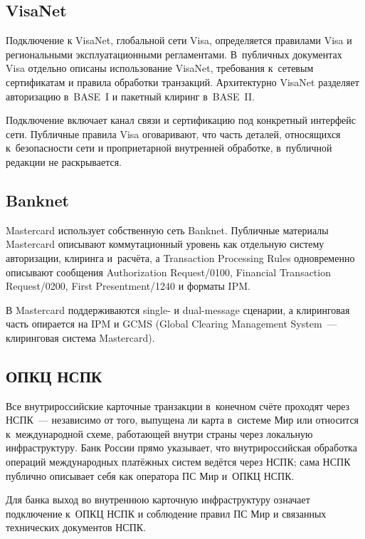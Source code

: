 \subsection*{VisaNet}

Подключение к VisaNet, глобальной сети Visa, определяется
правилами Visa и региональными эксплуатационными регламентами.
В~публичных документах Visa отдельно описаны использование
VisaNet, требования к~сетевым сертификатам и правила обработки
транзакций. Архитектурно VisaNet разделяет авторизацию в~BASE~I
и пакетный клиринг в~BASE~II.~\cite{visa-core-rules}

Подключение включает канал связи и сертификацию под конкретный
интерфейс сети. Публичные правила Visa оговаривают, что часть деталей,
относящихся к~безопасности сети и проприетарной внутренней
обработке,
в~публичной редакции не раскрывается.~\cite{visa-core-rules}

\subsection*{Banknet}

Mastercard использует собственную сеть Banknet.
Публичные материалы Mastercard описывают
коммутационный уровень как отдельную систему авторизации,
клиринга и~расчёта, а Transaction Processing Rules
одновременно описывают сообщения Authorization Request/0100,
Financial Transaction Request/0200, First Presentment/1240
и форматы IPM.~\cite{mc-switching-services,mc-tpr}

В Mastercard поддерживаются single- и dual-message сценарии, а клиринговая
часть опирается на IPM и GCMS (Global Clearing Management System~--- клиринговая система Mastercard).~\cite{mc-switching-services,mc-tpr}

\subsection*{ОПКЦ НСПК}

Все внутрироссийские карточные транзакции в~конечном счёте проходят через НСПК~---
независимо от того, выпущена ли карта в~системе
Мир или относится к~международной схеме, работающей внутри страны
через локальную инфраструктуру. Банк России прямо
указывает, что внутрироссийская обработка операций международных
платёжных систем ведётся через НСПК; сама НСПК публично описывает
себя как оператора ПС Мир и~ОПКЦ НСПК.~\cite{cbr-ps,nspk-about-company}

Для банка выход во внутреннюю
карточную инфраструктуру означает подключение
к~ОПКЦ НСПК и соблюдение правил ПС Мир и связанных
технических документов НСПК.~\cite{nspk-mir-rules}

